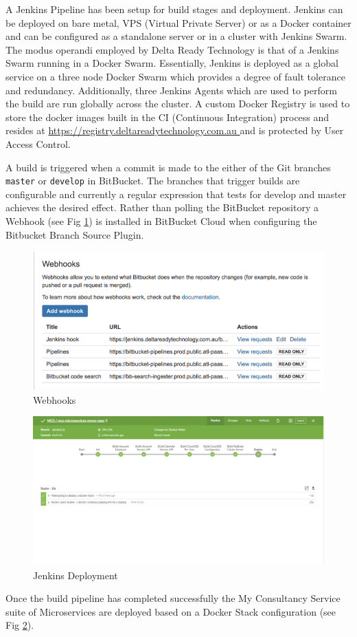A Jenkins Pipeline\cite{jenkinspipeline} has been setup for build stages and deployment.
Jenkins can be deployed on bare metal, VPS (Virtual Private Server) or as a Docker container and can be configured as a standalone server or in a cluster with Jenkins Swarm\cite{jenkinsSwarm}. The modus operandi employed by Delta Ready Technology is that of a Jenkins Swarm running in a Docker Swarm\cite{dockerswarm}. Essentially, Jenkins is deployed as a global service on a three node Docker Swarm which provides a degree of fault tolerance and redundancy.  Additionally, three Jenkins Agents which are used to perform the build are run globally across the cluster.  A custom Docker Registry is used to store the docker images built in the CI (Continuous Integration)\cite{CI} process and resides at
\url{https://registry.deltareadytechnology.com.au
} and is protected by User Access Control.

A build is triggered when a commit is made to the either of the Git branches \texttt{master} or \texttt{develop} in BitBucket.  The branches that trigger builds are configurable and currently a regular expression that tests for develop and master achieves the desired effect.  Rather than polling the BitBucket repository a Webhook (see Fig \ref{fig:webhooks}) is installed in BitBucket Cloud when configuring the Bitbucket Branch Source Plugin.

\begin{figure}
\includegraphics[width=\textwidth]{img/webhooks.png}
\caption{Webhooks}
\label{fig:webhooks}
\end{figure}


\begin{figure}
\includegraphics[width=\textwidth]{img/jenkins.png}
\caption{Jenkins Deployment}
\label{fig:jenkins}
\end{figure}

Once the build pipeline has completed successfully the My Consultancy Service suite of Microservices are deployed based on a Docker Stack\cite{dockerstack} configuration (see Fig \ref{fig:jenkins}). 




